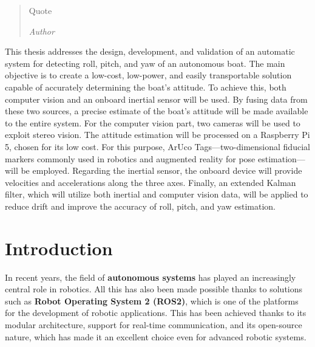 \documentclass[a4paper,12pt,twoside,openright]{book}
\newenvironment{abstract}{\cleardoublepage \null \vfill \begin{center}\bfseries\abstractname \end{center}}{\vfill\null}
\begin{document}
\begin{quote}
  Quote

  \textit{Author}
\end{quote}
\vfill
\null


\begingroup %
  \makeatletter
  \let\ps@plain\ps@empty
  \makeatother
  \tableofcontents
\endgroup

\begin{abstract} %
\markboth{}{} %
\thispagestyle{empty}
This thesis addresses the design, development, and validation of an automatic system for detecting roll, pitch, and yaw of an autonomous boat. The main objective is to create a low-cost, low-power, and easily transportable solution capable of accurately determining the boat’s attitude. To achieve this, both computer vision and an onboard inertial sensor will be used. By fusing data from these two sources, a precise estimate of the boat’s attitude will be made available to the entire system. For the computer vision part, two cameras will be used to exploit stereo vision. The attitude estimation will be processed on a Raspberry Pi 5, chosen for its low cost. For this purpose, ArUco Tags—two-dimensional fiducial markers commonly used in robotics and augmented reality for pose estimation—will be employed. Regarding the inertial sensor, the onboard device will provide velocities and accelerations along the three axes. Finally, an extended Kalman filter, which will utilize both inertial and computer vision data, will be applied to reduce drift and improve the accuracy of roll, pitch, and yaw estimation.
\end{abstract}



\mainmatter\doublespace 

\chapter*{Introduction} %
\thispagestyle{empty}
In recent years, the field of \textbf{autonomous systems} has played an increasingly central role in robotics. All this has also been made possible thanks to solutions such as \textbf{Robot Operating System 2 (ROS2)}, which is one of the platforms for the development of robotic applications. This has been achieved thanks to its modular architecture, support for real-time communication, and its open-source nature, which has made it an excellent choice even for advanced robotic systems.  
\end{document}
